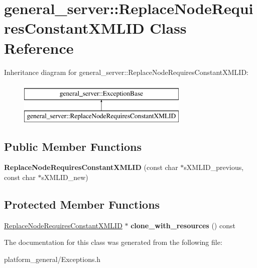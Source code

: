 \hypertarget{classgeneral__server_1_1ReplaceNodeRequiresConstantXMLID}{\section{general\-\_\-server\-:\-:\-Replace\-Node\-Requires\-Constant\-X\-M\-L\-I\-D \-Class \-Reference}
\label{classgeneral__server_1_1ReplaceNodeRequiresConstantXMLID}
}
\-Inheritance diagram for general\-\_\-server\-:\-:\-Replace\-Node\-Requires\-Constant\-X\-M\-L\-I\-D\-:\begin{figure}[H]
\begin{center}
\leavevmode
\includegraphics[height=2.000000cm]{classgeneral__server_1_1ReplaceNodeRequiresConstantXMLID}
\end{center}
\end{figure}
\subsection*{\-Public \-Member \-Functions}
\begin{DoxyCompactItemize}
\item 
\hypertarget{classgeneral__server_1_1ReplaceNodeRequiresConstantXMLID_adf3b4a61cb28be9d630548f5e0f5a8e0}{{\bfseries \-Replace\-Node\-Requires\-Constant\-X\-M\-L\-I\-D} (const char $\ast$s\-X\-M\-L\-I\-D\-\_\-previous, const char $\ast$s\-X\-M\-L\-I\-D\-\_\-new)}\label{classgeneral__server_1_1ReplaceNodeRequiresConstantXMLID_adf3b4a61cb28be9d630548f5e0f5a8e0}

\end{DoxyCompactItemize}
\subsection*{\-Protected \-Member \-Functions}
\begin{DoxyCompactItemize}
\item 
\hypertarget{classgeneral__server_1_1ReplaceNodeRequiresConstantXMLID_a0e6a0ba1768a0a05da465731aed0d99e}{\hyperlink{classgeneral__server_1_1ReplaceNodeRequiresConstantXMLID}{\-Replace\-Node\-Requires\-Constant\-X\-M\-L\-I\-D} $\ast$ {\bfseries clone\-\_\-with\-\_\-resources} () const }\label{classgeneral__server_1_1ReplaceNodeRequiresConstantXMLID_a0e6a0ba1768a0a05da465731aed0d99e}

\end{DoxyCompactItemize}


\-The documentation for this class was generated from the following file\-:\begin{DoxyCompactItemize}
\item 
platform\-\_\-general/\-Exceptions.\-h\end{DoxyCompactItemize}
